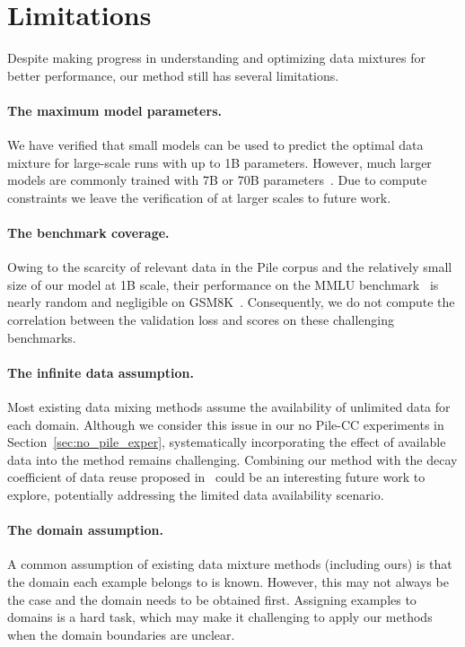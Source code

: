 \section{Limitations}
\label{sec:limitations}

Despite making progress in understanding and optimizing data mixtures for better performance, our method still has several limitations.

\paragraph{The maximum model parameters.} We have verified that small models can be used to predict the optimal data mixture for large-scale runs with up to 1B parameters. However, much larger models are commonly trained with 7B or 70B parameters~\citep{llama2paper}. Due to compute constraints we leave the verification of \ourmethod at larger scales to future work.

\paragraph{The benchmark coverage.} Owing to the scarcity of relevant data in the Pile corpus and the relatively small size of our model at 1B scale, their performance on the MMLU benchmark~\citep{MMLU2021} is nearly random and negligible on GSM8K~\citep{gsm8k2021}. Consequently, we do not compute the correlation between the validation loss and scores on these challenging benchmarks.


\paragraph{The infinite data assumption.} Most existing data mixing methods assume the availability of unlimited data for each domain. Although we consider this issue in our no Pile-CC experiments in Section~\ref{sec:no_pile_exper}, systematically incorporating the effect of available data into the method remains challenging. Combining our method with the decay coefficient of data reuse proposed in~\citet{muennighoff2023scaling} could be an interesting future work to explore, potentially addressing the limited data availability scenario.

\paragraph{The domain assumption.} 

A common assumption of existing data mixture methods (including ours) is that the domain each example belongs to is known. However, this may not always be the case and the domain needs to be obtained first. Assigning examples to domains is a hard task, which may make it challenging to apply our methods when the domain boundaries are unclear.

